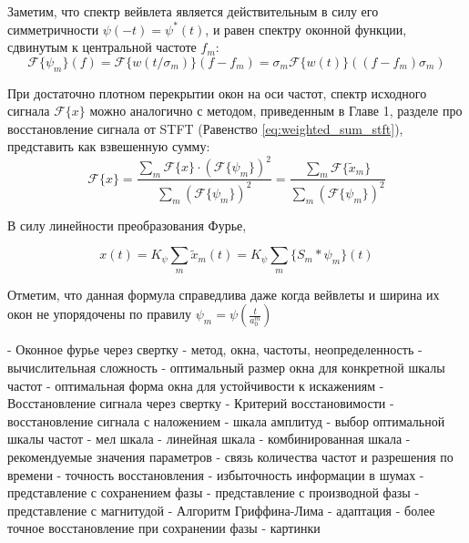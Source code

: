 Заметим, что спектр вейвлета является действительным в силу его симметричности $\psi(-t) = \psi^{*}(t)$, и равен спектру оконной функции, сдвинутым к центральной частоте $f_m$:
\begin{equation}
  \mathcal{F}\{\psi_m\}(f) = \mathcal{F}\{w(t/\sigma_m)\}(f - f_m) = \sigma_m \mathcal{F}\{w(t)\}((f - f_m) \sigma_m)
\end{equation}

При достаточно плотном перекрытии окон на оси частот, спектр исходного сигнала $\mathcal{F}\{x\}$ можно аналогично с методом, 
приведенным в Главе 1, разделе про восстановление сигнала от STFT (Равенство \ref{eq:weighted_sum_stft}), 
представить как взвешенную сумму:
\begin{equation}
  \mathcal{F}\{x\} = \frac{
    \sum \limits_m \mathcal{F}\{x\} \cdot (\mathcal{F}\{\psi_m\})^2
  }{
    \sum \limits_m (\mathcal{F}\{\psi_m\})^2
  } = 
  \frac{
    \sum \limits_m \mathcal{F}\{\tilde{x}_m\}
  }{
    \sum \limits_m (\mathcal{F}\{\psi_m\})^2
  }
\end{equation}

В силу линейности преобразования Фурье,

\begin{equation}
x(t) = K_{\psi} \sum \limits_m \tilde{x}_m(t) = K_{\psi} \sum \limits_m \{S_m * \psi_m\}(t)
\end{equation}

Отметим, что данная формула справедлива даже когда вейвлеты и ширина их окон не упорядочены по правилу $\psi_m = \psi(\frac{t}{a_0^m})$

\begin{markdown}
 - Оконное фурье через свертку
   - метод, окна, частоты, неопределенность
   - вычислительная сложность
 - оптимальный размер окна для конкретной шкалы частот
 - оптимальная форма окна для устойчивости к искажениям
 - Восстановление сигнала через свертку
 - Критерий восстановимости
 - восстановление сигнала с наложением
 - шкала амплитуд
 - выбор оптимальной шкалы частот
   - мел шкала
   - линейная шкала
   - комбинированная шкала
 - рекомендуемые значения параметров
 - связь количества частот и разрешения по времени
 - точность восстановления
 - избыточность информации в шумах
 - представление с сохранением фазы
 - представление с производной фазы
 - представление с магнитудой
 - Алгоритм Гриффина-Лима
  - адаптация
  - более точное восстановление при сохранении фазы
 - картинки
\end{markdown}

